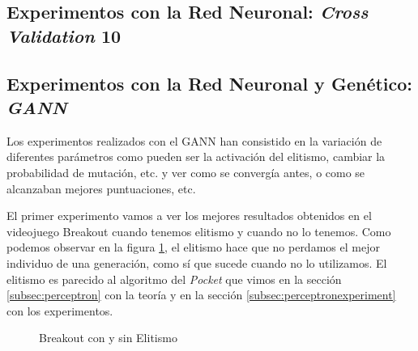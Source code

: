 \newpage
\subsection{Experimentos con la Red Neuronal: \textit{Cross Validation} 10}
\label{subsubsec:nnexperiments:CV10}

\newpage
\subsection{Experimentos con la Red Neuronal y Genético: \textit{GANN}}
\label{subsubsec:nnexperiments:GANN}

Los experimentos realizados con el GANN han consistido en la variación de diferentes parámetros como pueden ser la activación del elitismo, cambiar la probabilidad de mutación, etc. y ver como se convergía antes, o como se alcanzaban mejores puntuaciones, etc.

El primer experimento vamos a ver los mejores resultados obtenidos en el videojuego Breakout cuando tenemos elitismo y cuando no lo tenemos. Como podemos observar en la figura \ref{fig:breakoutWithAndWithoutElitism}, el elitismo hace que no perdamos el mejor individuo de una generación, como sí que sucede cuando no lo utilizamos. El elitismo es parecido al algoritmo del \textit{Pocket} que vimos en la sección \ref{subsec:perceptron} con la teoría y en la sección \ref{subsec:perceptronexperiment} con los experimentos.

\begin{figure}[H]
    \centering
    
    
    \caption{Breakout con y sin Elitismo}
    \label{fig:breakoutWithAndWithoutElitism}
\end{figure}


